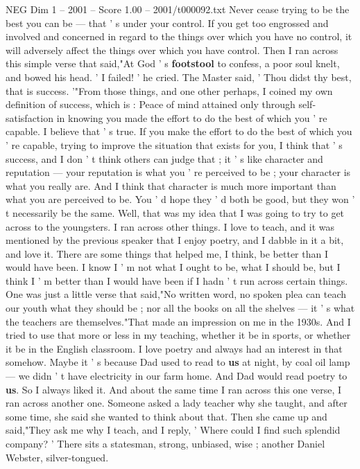 \begin{textsample}{NEG Dim 1 – 2001 – Score 1.00 – 2001/t000092.txt}
Never cease trying to be the best you can be — that ' s under your control.
If you get too engrossed and involved and concerned in regard to the things over which you have no control, it will adversely affect the things over which you have control.
Then I ran across this simple verse that said,"At God ' s \textbf{footstool} to confess, a poor soul knelt, and bowed his head. ' I failed! ' he cried.
The Master said, ' Thou didst thy best, that is success. '"From those things, and one other perhaps, I coined my own definition of success, which is : Peace of mind attained only through self-satisfaction in knowing you made the effort to do the best of which you ' re capable.
I believe that ' s true.
If you make the effort to do the best of which you ' re capable, trying to improve the situation that exists for you, I think that ' s success, and I don ' t think others can judge that ; it ' s like character and reputation — your reputation is what you ' re perceived to be ; your character is what you really are.
And I think that character is much more important than what you are perceived to be.
You ' d hope they ' d both be good, but they won ' t necessarily be the same.
Well, that was my idea that I was going to try to get across to the youngsters.
I ran across other things.
I love to teach, and it was mentioned by the previous speaker that I enjoy poetry, and I dabble in it a bit, and love it.
There are some things that helped me, I think, be better than I would have been.
I know I ' m not what I ought to be, what I should be, but I think I ' m better than I would have been if I hadn ' t run across certain things.
One was just a little verse that said,"No written word, no spoken plea can teach our youth what they should be ; nor all the books on all the shelves — it ' s what the teachers are themselves."That made an impression on me in the 1930s.
And I tried to use that more or less in my teaching, whether it be in sports, or whether it be in the English classroom.
I love poetry and always had an interest in that somehow.
Maybe it ' s because Dad used to read to \textbf{us} at night, by coal oil lamp — we didn ' t have electricity in our farm home.
And Dad would read poetry to \textbf{us}.
So I always liked it.
And about the same time I ran across this one verse, I ran across another one.
Someone asked a lady teacher why she taught, and after some time, she said she wanted to think about that.
Then she came up and said,"They ask me why I teach, and I reply, ' Where could I find such splendid company? ' There sits a statesman, strong, unbiased, wise ; another Daniel Webster, silver-tongued.

\end{textsample}
